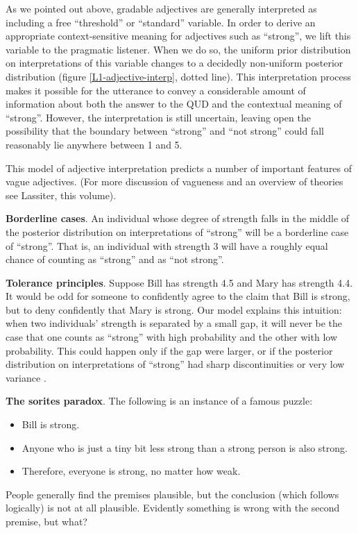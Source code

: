 \documentclass[pdfextras]{handbook}
\begin{document}
As we pointed out above, gradable adjectives are generally interpreted as including a free ``threshold'' or ``standard'' variable. In order to derive an appropriate context-sensitive meaning for adjectives such as ``strong'', we lift this variable to the pragmatic listener. 
When we do so, the uniform prior distribution on interpretations of this variable changes to a decidedly non-uniform posterior distribution (figure \ref{L1-adjective-interp}, dotted line). 
This interpretation process makes it possible for the utterance to convey a considerable amount of information about both the answer to the QUD and the contextual meaning of ``strong''. 
However, the interpretation is still uncertain, leaving open the possibility that the boundary between ``strong'' and ``not strong'' could fall reasonably lie anywhere between 1 and 5.

This model of adjective interpretation predicts a number of important features of vague adjectives. 
(For more discussion of vagueness and an overview of theories see Lassiter, this volume).

\textbf{Borderline cases}. An individual whose degree of strength falls in the middle of the posterior distribution on interpretations of ``strong'' will be a borderline case of ``strong''. 
That is, an individual with strength 3 will have a roughly equal chance of counting as ``strong'' and as ``not strong''.  
 
\textbf{Tolerance principles}. Suppose Bill has strength 4.5 and Mary has strength 4.4. It would be odd for someone to confidently agree to the claim that Bill is strong, but to deny confidently that Mary is strong. 
Our model explains this intuition: when two individuals' strength is separated by a small gap, it will never be the case that one counts as ``strong'' with high probability and the other with low probability. 
This could happen only if the gap were larger, or if the posterior distribution on interpretations of ``strong'' had sharp discontinuities or very low variance \citep{lassitergoodman13}. 

\textbf{The sorites paradox}. The following is an instance of a famous puzzle:
\begin{itemize}
\item Bill is strong.
\item Anyone who is just a tiny bit less strong than a strong person is also strong.
\item Therefore, everyone is strong, no matter how weak.
\end{itemize}
People generally find the premises plausible, but the conclusion (which follows logically) is not at all plausible. Evidently something is wrong with the second premise, but what? 
\end{document}

